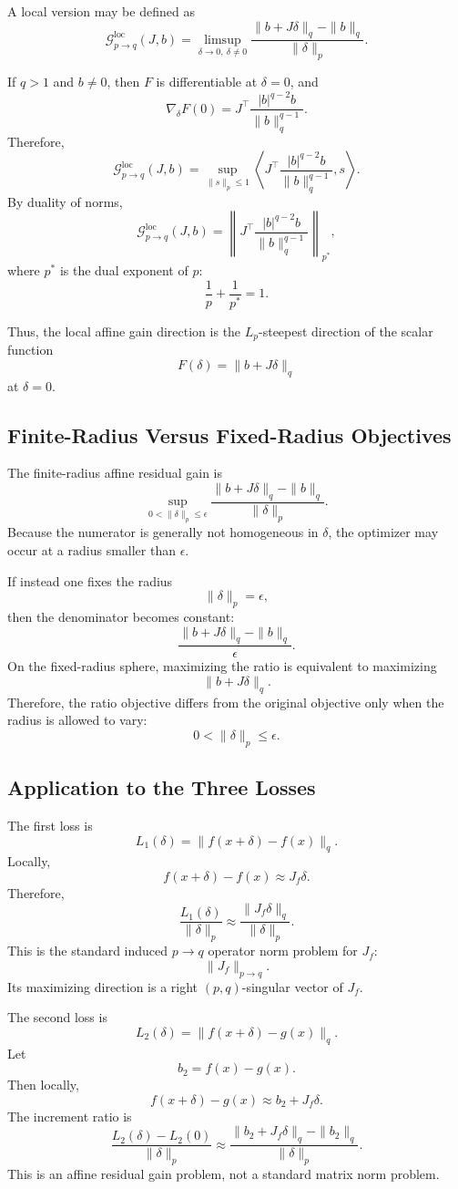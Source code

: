 \documentclass{article}
\begin{document}
A local version may be defined as
\[
\mathcal G_{p\to q}^{\mathrm{loc}}(J,b)
=
\limsup_{\delta\to0,\ \delta\neq0}
\frac{
\|b+J\delta\|_q-\|b\|_q
}{
\|\delta\|_p
}.
\]

If $q>1$ and $b\neq0$, then $F$ is differentiable at $\delta=0$, and
\[
\nabla_\delta F(0)
=
J^\top
\frac{|b|^{q-2}b}{\|b\|_q^{q-1}}.
\]
Therefore,
\[
\mathcal G_{p\to q}^{\mathrm{loc}}(J,b)
=
\sup_{\|s\|_p\le1}
\left\langle
J^\top
\frac{|b|^{q-2}b}{\|b\|_q^{q-1}},
s
\right\rangle.
\]
By duality of norms,
\[
\mathcal G_{p\to q}^{\mathrm{loc}}(J,b)
=
\left\|
J^\top
\frac{|b|^{q-2}b}{\|b\|_q^{q-1}}
\right\|_{p^\ast},
\]
where $p^\ast$ is the dual exponent of $p$:
\[
\frac{1}{p}+\frac{1}{p^\ast}=1.
\]

Thus, the local affine gain direction is the $L_p$-steepest direction of the scalar function
\[
F(\delta)=\|b+J\delta\|_q
\]
at $\delta=0$.

\subsection{Finite-Radius Versus Fixed-Radius Objectives}

The finite-radius affine residual gain is
\[
\sup_{0<\|\delta\|_p\le\epsilon}
\frac{
\|b+J\delta\|_q-\|b\|_q
}{
\|\delta\|_p
}.
\]
Because the numerator is generally not homogeneous in $\delta$, the optimizer may occur at a radius smaller than $\epsilon$.

If instead one fixes the radius
\[
\|\delta\|_p=\epsilon,
\]
then the denominator becomes constant:
\[
\frac{
\|b+J\delta\|_q-\|b\|_q
}{
\epsilon
}.
\]
On the fixed-radius sphere, maximizing the ratio is equivalent to maximizing
\[
\|b+J\delta\|_q.
\]
Therefore, the ratio objective differs from the original objective only when the radius is allowed to vary:
\[
0<\|\delta\|_p\le\epsilon.
\]

\subsection{Application to the Three Losses}

The first loss is
\[
L_1(\delta)
=
\|f(x+\delta)-f(x)\|_q.
\]
Locally,
\[
f(x+\delta)-f(x)
\approx
J_f\delta.
\]
Therefore,
\[
\frac{L_1(\delta)}{\|\delta\|_p}
\approx
\frac{\|J_f\delta\|_q}{\|\delta\|_p}.
\]
This is the standard induced $p\to q$ operator norm problem for $J_f$:
\[
\|J_f\|_{p\to q}.
\]
Its maximizing direction is a right $(p,q)$-singular vector of $J_f$.

The second loss is
\[
L_2(\delta)
=
\|f(x+\delta)-g(x)\|_q.
\]
Let
\[
b_2=f(x)-g(x).
\]
Then locally,
\[
f(x+\delta)-g(x)
\approx
b_2+J_f\delta.
\]
The increment ratio is
\[
\frac{
L_2(\delta)-L_2(0)
}{
\|\delta\|_p
}
\approx
\frac{
\|b_2+J_f\delta\|_q-\|b_2\|_q
}{
\|\delta\|_p
}.
\]
This is an affine residual gain problem, not a standard matrix norm problem.
\end{document}
